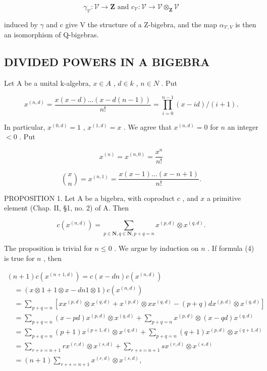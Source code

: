 \[
\gamma_ {\mathcal {V}} \colon \mathcal {V} \to \mathbf {Z} \text { and } c _ {\mathcal {V}} \colon \mathcal {V} \to \mathcal {V} \otimes_ {\mathbf {Z}} \mathcal {V}
\]

induced by \(\gamma\) and c give V the structure of a Z-bigebra, and the map \(\alpha_{\mathcal{V},V}\) is then an isomorphism of Q-bigebras.

\subsection{DIVIDED POWERS IN A BIGEBRA}

Let A be a unital k-algebra, \(x \in A\) , \(d \in k\) , \(n \in N\) . Put

\[
x ^ {(n, d)} = \frac {x (x - d) \dots (x - d (n - 1))}{n !} = \prod_ {i = 0} ^ {n - 1} (x - i d) / (i + 1).\tag{1}
\]

In particular, \(x^{(0,d)} = 1\) , \(x^{(1,d)} = x\) . We agree that \(x^{(n,d)} = 0\) for \(n\) an integer \(< 0\) . Put

\[
x ^ {(n)} = x ^ {(n, 0)} = \frac {x ^ {n}}{n !}\tag{2}
\]

\[
\binom {x} {n} = x ^ {(n, 1)} = \frac {x (x - 1) \ldots (x - n + 1)}{n !}.\tag{3}
\]

PROPOSITION 1. Let A be a bigebra, with coproduct \(c\) , and \(x\) a primitive element (Chap. II, §1, no. 2) of A. Then

\[
c (x ^ {(n, d)}) = \sum_ {p \in \mathbf {N}, q \in \mathbf {N}, p + q = n} x ^ {(p, d)} \otimes x ^ {(q, d)}.\tag{4}
\]

The proposition is trivial for \(n \leq 0\) . We argue by induction on \(n\) . If formula (4) is true for \(n\) , then

\[
\begin{array}{l} (n + 1) c (x ^ {(n + 1, d)}) = c (x - d n) c (x ^ {(n, d)}) \\ \quad = (x \otimes 1 + 1 \otimes x - d n   1 \otimes 1) c (x ^ {(n, d)}) \\ \quad = \sum_ {p + q = n} [ x x ^ {(p, d)} \otimes x ^ {(q, d)} + x ^ {(p, d)} \otimes x x ^ {(q, d)} - (p + q) d x ^ {(p, d)} \otimes x ^ {(q, d)} ] \\ \quad = \sum_ {p + q = n} (x - p d) x ^ {(p, d)} \otimes x ^ {(q, d)} + \sum_ {p + q = n} x ^ {(p, d)} \otimes (x - q d) x ^ {(q, d)} \\ \quad = \sum_ {p + q = n} (p + 1) x ^ {(p + 1, d)} \otimes x ^ {(q, d)} + \sum_ {p + q = n} (q + 1) x ^ {(p, d)} \otimes x ^ {(q + 1, d)} \\ \quad = \sum_ {r + s = n + 1} r x ^ {(r, d)} \otimes x ^ {(s, d)} + \sum_ {r + s = n + 1} s x ^ {(r, d)} \otimes x ^ {(s, d)} \\ \quad = (n + 1) \sum_ {r + s = n + 1} x ^ {(r, d)} \otimes x ^ {(s, d)}, \end{array}
\]

